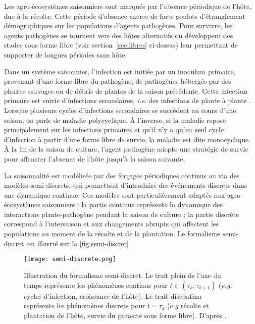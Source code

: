 	Les agro-écosystèmes saisonniers sont marqués par l'absence périodique de l'hôte, due à la récolte. 
Cette période d'absence exerce de forts goulots d’étranglement démographiques sur les populations d'agents pathogènes. Pour survivre, les agents pathogènes se tournent vers des hôtes alternatifs ou développent des stades sous forme libre (voir section~\ref{sec:libres} ci-dessus) leur permettant de supporter de longues périodes sans hôte. 
	
	Dans un système saisonnier, l'infection est initiée par un inoculum primaire, provenant d'une forme libre du pathogène, de pathogènes hébergés par des plantes sauvages ou de débris de plantes de la saison précédente. Cette infection primaire est suivie d'infections secondaires, \textit{i.e.} des infections de plante à plante \citep{Campbell1990}. Lorsque plusieurs cycles d’infections secondaires se succèdent au cours d’une saison, on parle de maladie polycyclique. À l'inverse, si la maladie repose principalement sur les infections primaires et qu'il n’y a qu’un seul cycle d’infection à partir d'une forme libre de survie, la maladie est dite monocyclique.
À la fin de la saison de culture, l'agent pathogène adopte une stratégie de survie pour affronter l’absence de l’hôte jusqu'à la saison suivante. 
	 
	La saisonnalité est modélisée par des forçages périodiques continus \citep{Murray2013} ou via des modèles semi-discrets, qui permettent d'introduire des événements discrets dans une dynamique continue. Ces modèles sont particulièrement adaptés aux agro-écosystèmes saisonniers : la partie continue représente la dynamique des interactions plante-pathogène pendant la saison de culture ; la partie discrète correspond à l'intersaison et aux changements abrupts qui affectent les populations au moment de la récolte et de la plantation. Le formalisme semi-discret est illustré sur la \autoref{fig:semi-discret}
	
	 \begin{figure}[ht]
	  \centering
		  \texttt{[image: semi-discrete.png]}
		  \caption[Illustration du formalisme semi-discret.]{Illustration du formalisme  semi-discret.
		    Le trait plein de l’axe du temps représente les phénomènes continus pour $t \in (\tau_k;\tau_{k+1})$  
		    (\textit{e.g.} cycles d’infection, croissance de l'hôte). Le trait discontinu représente les phénomènes 
		    discrets pour $t = \tau_k$ ($e.g$  récolte et plantation de l'hôte, survie du parasite sous forme libre).
		    D'après \citet{Mailleret2009}.}
		  \label{fig:semi-discret}
	 \end{figure}
	
